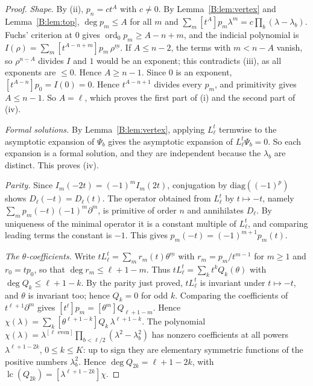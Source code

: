 \documentclass[11pt,a4paper]{article}
\theoremstyle{definition}
\theoremstyle{remark}
\newcommand{\ff}[2]{#1^{\underline{#2}}}
\DeclareMathOperator{\ord}{ord}
\DeclareMathOperator{\lc}{lc}
\numberwithin{equation}{section}
\begin{document}
\begin{proof}
\emph{Shape.} By (ii), $p_n=ct^A$ with $c\ne0$. By Lemma~\ref{B:lem:vertex} and Lemma~\ref{B:lem:top}, $\deg p_m\le A$ for all $m$ and $\sum_m[t^A]p_m\lambda^m=c\prod_b(\lambda-\lambda_b)$. Fuchs' criterion at $0$ gives $\ord_0p_m\ge A-n+m$, and the indicial polynomial is $I(\rho)=\sum_m[t^{A-n+m}]p_m\,\ff{\rho}{m}$. If $A\le n-2$, the terms with $m<n-A$ vanish, so $\ff{\rho}{n-A}$ divides $I$ and $1$ would be an exponent; this contradicts (iii), as all exponents are $\le0$. Hence $A\ge n-1$. Since $0$ is an exponent, $[t^{A-n}]p_0=I(0)=0$. Hence $t^{A-n+1}$ divides every $p_m$, and primitivity gives $A\le n-1$. So $A=\ell$, which proves the first part of (i) and the second part of (iv).

\emph{Formal solutions.} By Lemma~\ref{B:lem:vertex}, applying $L^t_\ell$ termwise to the asymptotic expansion of $\Psi_b$ gives the asymptotic expansion of $L^t_\ell\Psi_b=0$. So each expansion is a formal solution, and they are independent because the $\lambda_b$ are distinct. This proves (iv).

\emph{Parity.} Since $I_m(-2t)=(-1)^mI_m(2t)$, conjugation by $\mathrm{diag}((-1)^p)$ shows $D_\ell(-t)=D_\ell(t)$. The operator obtained from $L^t_\ell$ by $t\mapsto-t$, namely $\sum_mp_m(-t)(-1)^m\partial^m$, is primitive of order $n$ and annihilates $D_\ell$. By uniqueness of the minimal operator it is a constant multiple of $L^t_\ell$, and comparing leading terms the constant is $-1$. This gives $p_m(-t)=(-1)^{m+1}p_m(t)$.

\emph{The $\theta$-coefficients.} Write $tL^t_\ell=\sum_mr_m(t)\ff{\theta}{m}$ with $r_m=p_m/t^{m-1}$ for $m\ge1$ and $r_0=tp_0$, so that $\deg r_m\le\ell+1-m$. Thus $tL^t_\ell=\sum_kt^kQ_k(\theta)$ with $\deg Q_k\le\ell+1-k$. By the parity just proved, $tL^t_\ell$ is invariant under $t\mapsto-t$, and $\theta$ is invariant too; hence $Q_k=0$ for odd $k$. Comparing the coefficients of $t^{\ell+1}\partial^m$ gives $[t^\ell]p_m=[\theta^m]Q_{\ell+1-m}$. Hence $\chi(\lambda)=\sum_k[\theta^{\ell+1-k}]Q_k\,\lambda^{\ell+1-k}$. The polynomial $\chi(\lambda)=\lambda^{[\ell\text{ even}]}\prod_{b<\ell/2}(\lambda^2-\lambda_b^2)$ has nonzero coefficients at all powers $\lambda^{\ell+1-2k}$, $0\le k\le K$: up to sign they are elementary symmetric functions of the positive numbers $\lambda_b^2$. Hence $\deg Q_{2k}=\ell+1-2k$, with $\lc(Q_{2k})=[\lambda^{\ell+1-2k}]\chi$.


\end{proof}
\end{document}
